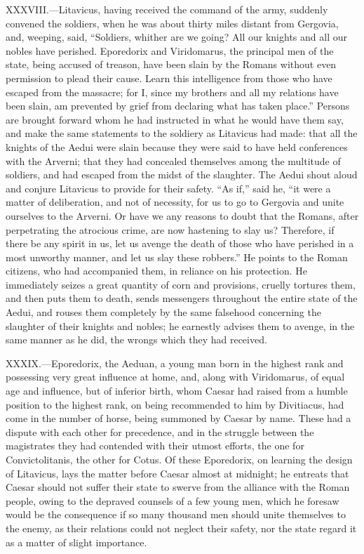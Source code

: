 XXXVIII.—Litavicus, having received the command of the army, suddenly
convened the soldiers, when he was about thirty miles distant from
Gergovia, and, weeping, said, ``Soldiers, whither are we going? All our
knights and all our nobles have perished. Eporedorix and Viridomarus,
the principal men of the state, being accused of treason, have been
slain by the Romans without even permission to plead their cause. Learn
this intelligence from those who have escaped from the massacre; for I,
since my brothers and all my relations have been slain, am prevented by
grief from declaring what has taken place.'' Persons are brought forward
whom he had instructed in what he would have them say, and make the same
statements to the soldiery as Litavicus had made: that all the knights
of the Aedui were slain because they were said to have held conferences
with the Arverni; that they had concealed themselves among the multitude
of soldiers, and had escaped from the midst of the slaughter. The Aedui
shout aloud and conjure Litavicus to provide for their safety. ``As if,''
said he, ``it were a matter of deliberation, and not of necessity, for us
to go to Gergovia and unite ourselves to the Arverni. Or have we any
reasons to doubt that the Romans, after perpetrating the atrocious
crime, are now hastening to slay us? Therefore, if there be any spirit
in us, let us avenge the death of those who have perished in a most
unworthy manner, and let us slay these robbers.'' He points to the Roman
citizens, who had accompanied them, in reliance on his protection. He
immediately seizes a great quantity of corn and provisions, cruelly
tortures them, and then puts them to death, sends messengers throughout
the entire state of the Aedui, and rouses them completely by the same
falsehood concerning the slaughter of their knights and nobles; he
earnestly advises them to avenge, in the same manner as he did, the
wrongs which they had received.

XXXIX.—Eporedorix, the Aeduan, a young man born in the highest rank and
possessing very great influence at home, and, along with Viridomarus, of
equal age and influence, but of inferior birth, whom Caesar had raised
from a humble position to the highest rank, on being recommended to him
by Divitiacus, had come in the number of horse, being summoned by Caesar
by name. These had a dispute with each other for precedence, and in the
struggle between the magistrates they had contended with their utmost
efforts, the one for Convictolitanis, the other for Cotus. Of these
Eporedorix, on learning the design of Litavicus, lays the matter before
Caesar almost at midnight; he entreats that Caesar should not suffer
their state to swerve from the alliance with the Roman people, owing to
the depraved counsels of a few young men, which he foresaw would be the
consequence if so many thousand men should unite themselves to the
enemy, as their relations could not neglect their safety, nor the state
regard it as a matter of slight importance.

